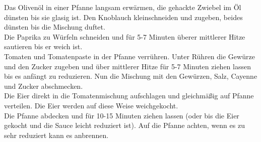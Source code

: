 \vspace*{\fill}
\begin{multicols}{2}


Das Olivenöl in einer Pfanne langsam erwärmen, die gehackte Zwiebel im Öl dünsten bis sie glasig ist.
Den Knoblauch kleinschneiden und zugeben, beides dünsten bis die Mischung duftet.\\


Die Paprika zu Würfeln schneiden und für 5-7 Minuten überer mittlerer Hitze sautieren bis er weich ist.\\

Tomaten und Tomatenpaste in der Pfanne verrühren.
Unter Rühren die Gewürze und den Zucker zugeben und über mittlerer Hitze 
für 5-7  Minuten ziehen lassen bis es anfängt zu reduzieren.
Nun die Mischung mit den Gewürzen, Salz, Cayenne und Zucker abschmecken.\\


Die Eier direkt in die Tomatenmischung aufschlagen und gleichmäßig 
auf Pfanne verteilen.
Die Eier werden auf diese Weise weichgekocht. \\


Die Pfanne abdecken und für 10-15 Minuten ziehen lassen
(oder bis die Eier gekocht und die Sauce leicht reduziert ist).
Auf die Pfanne achten, wenn es zu sehr reduziert kann es anbrennen.\\



\end{multicols}
